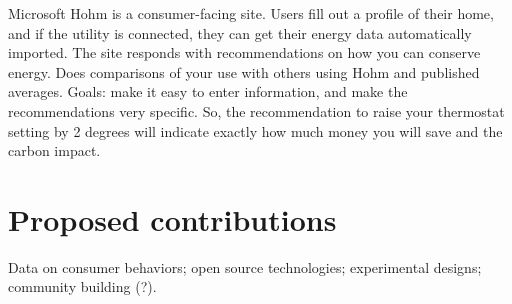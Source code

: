 Microsoft Hohm is a consumer-facing site.  Users fill out a profile of
their home, and if the utility is connected, they can get their energy data
automatically imported.  The site responds with recommendations on how you
can conserve energy. Does comparisons of your use with others using Hohm
and
published averages.   Goals: make it easy to enter information, and make
the recommendations very specific.  So, the recommendation to raise your
thermostat setting by 2 degrees will indicate exactly how much money you
will save and the carbon impact.


\section{Proposed contributions}

Data on consumer behaviors; open source technologies; experimental designs;
community building (?).


 










